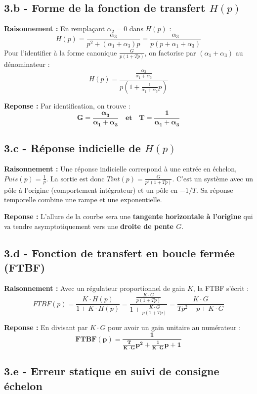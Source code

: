 \documentclass[11pt,a4paper]{article}
\begin{document}
\subsection*{3.b - Forme de la fonction de transfert $H(p)$}

\textbf{Raisonnement :} En remplaçant $\alpha_2 = 0$ dans $H(p)$ :
$$ H(p) = \frac{\alpha_3}{p^2 + (\alpha_1 + \alpha_3)p} = \frac{\alpha_3}{p(p + \alpha_1 + \alpha_3)} $$
Pour l'identifier à la forme canonique $\frac{G}{p(1+Tp)}$, on factorise par $(\alpha_1 + \alpha_3)$ au dénominateur :
$$ H(p) = \frac{\frac{\alpha_3}{\alpha_1 + \alpha_3}}{p\left(1 + \frac{1}{\alpha_1 + \alpha_3}p\right)} $$

\textbf{Reponse :} Par identification, on trouve :
$$ 
\mathbf{G = \frac{\alpha_3}{\alpha_1 + \alpha_3} \quad \text{et} \quad T = \frac{1}{\alpha_1 + \alpha_3}} 
$$

\subsection*{3.c - Réponse indicielle de $H(p)$}

\textbf{Raisonnement :} Une réponse indicielle correspond à une entrée en échelon, $Puis(p) = \frac{1}{p}$. La sortie est donc $Tint(p) = \frac{G}{p^2(1+Tp)}$.
C'est un système avec un pôle à l'origine (comportement intégrateur) et un pôle en $-1/T$. Sa réponse temporelle combine une rampe et une exponentielle.

\textbf{Reponse :} L'allure de la courbe sera une \textbf{tangente horizontale à l'origine} qui va tendre asymptotiquement vers une \textbf{droite de pente $G$}.

\subsection*{3.d - Fonction de transfert en boucle fermée (FTBF)}

\textbf{Raisonnement :} Avec un régulateur proportionnel de gain $K$, la FTBF s'écrit :
$$ FTBF(p) = \frac{K \cdot H(p)}{1 + K \cdot H(p)} = \frac{\frac{K \cdot G}{p(1+Tp)}}{1 + \frac{K \cdot G}{p(1+Tp)}} = \frac{K \cdot G}{Tp^2 + p + K \cdot G} $$

\textbf{Reponse :} En divisant par $K \cdot G$ pour avoir un gain unitaire au numérateur :
$$ 
\mathbf{FTBF(p) = \frac{1}{\frac{T}{K \cdot G}p^2 + \frac{1}{K \cdot G}p + 1}} 
$$

\subsection*{3.e - Erreur statique en suivi de consigne échelon}
\end{document}
